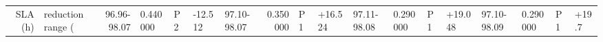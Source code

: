 \begin{tabular}{rlrllllr}
\toprule
SLA (h) & reduction range (%
 & 96.96-98.07 & 0.440000 & P2 & -12.5%
12 & 97.10-98.07 & 0.350000 & P1 & +16.5%
24 & 97.11-98.08 & 0.290000 & P1 & +19.0%
48 & 97.10-98.09 & 0.290000 & P1 & +19.7%
\bottomrule
\end{tabular}
